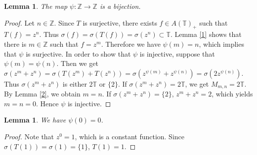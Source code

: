 \documentclass[10pt]{amsart}
\newtheorem{lemma}[theorem]{Lemma}
\begin{document}
\begin{lemma}\label{B1}
The map $\psi:\mathbb{Z} \to \mathbb{Z}$ is a bijection.
\end{lemma}
\begin{proof}
Let $n \in \mathbb{Z}$. Since $T$ is surjective, there exists $f \in A(\mathbb{T})_{+}$ such that $T(f)=z^{n}$. Thus $\sigma(f)=\sigma(T(f))=\sigma(z^n) \subset \mathbb{T}$. Lemma \ref{1} shows that there is $m \in \mathbb{Z}$ such that $f=z^{m}$. Therefore we have $\psi(m)=n$, which implies that $\psi$ is surjective. In order to show that  $\psi$ is injective, suppose that $\psi(m)=\psi(n)$. Then we get $\sigma(z^{m}+z^{n})=\sigma(T(z^m)+T(z^n))=\sigma(z^{\psi(m)}+z^{\psi(n)})=\sigma(2z^{\psi(n)})$. Thus $\sigma(z^{m}+z^{n})$ is either $2\mathbb{T}$ or $\{2\}$. If $\sigma(z^{m}+z^{n})=2\mathbb{T}$, we get $M_{m,n}=2\mathbb{T}$.  By Lemma \ref{2}, we obtain $m=n$.  If $\sigma(z^{m}+z^{n})=\{2\}$, $z^{m}+z^{n}=2$, which yields  $m=n=0$. Hence $\psi$ is injective.
\end{proof}


\begin{lemma}\label{p0}
We have $\psi(0)=0$. 
\end{lemma}
\begin{proof}
Note that $z^0=1$, which is a constant function. Since $\sigma(T(1))=\sigma(1)=\{1\}$, $T(1)=1$.  
\end{proof}
\end{document}
